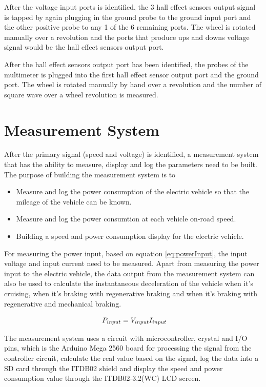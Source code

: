 After the voltage input ports is identified, the 3 hall effect sensors output signal is tapped by again plugging in the ground probe to the ground input port and the other positive probe to any 1 of the 6 remaining ports. The wheel is rotated manually over a revolution and the ports that produce ups and downs voltage signal would be the hall effect sensors output port.

After the hall effect sensors output port has been identified, the probes of the multimeter is plugged into the first hall effect sensor output port and the ground port. The wheel is rotated manually by hand over a revolution and the number of square wave over a wheel revolution is measured. 

\section{Measurement System}
After the primary signal (speed and voltage) is identified, a measurement system that has the ability to measure, display and log the parameters need to be built. The purpose of building the measurement system is to

\begin{itemize}
	\item{Measure and log the power consumption of the electric vehicle so that the mileage of the vehicle can be known.}
	\item{Measure and log the power consumtion at each vehicle on-road speed.}
	\item{Building a speed and power consumption display for the electric vehicle.}
\end{itemize}

For measuring the power input, based on equation \ref{eq:powerInput}, the input voltage and input current need to be measured. Apart from measuring the power input to the electric vehicle, the data output from the measurement system can also be used to calculate the instantaneous deceleration of the vehicle when it's cruising, when it's braking with regenerative braking and when it's braking with regenerative and mechanical braking.

\begin{equation}
	\label{eq:powerInput}
	\text{\myequations{Power Input}}
	P_{input} = V_{input}I_{input}
\end{equation}

The measurement system uses a circuit with microcontroller, crystal and I/O pins, which is the Arduino Mega 2560 board for processing the signal from the controller circuit, calculate the real value based on the signal, log the data into a SD card through the ITDB02 shield and display the speed and power consumption value through the ITDB02-3.2(WC) LCD screen.

